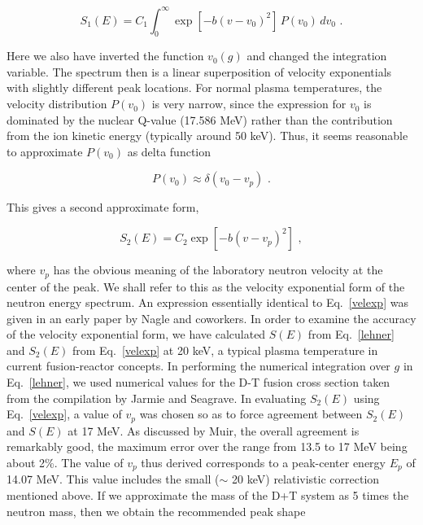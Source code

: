 \begin{equation}
  S_1(E)=C_1 \int_0^\infty \exp[-b(v-v_0)^2]\,P(v_0)\,dv_0 \,\,.
\label{intexp}
\end{equation}

\noindent
Here we also have inverted the function $v_0(g)$ and changed the
integration variable.  The spectrum then is a linear superposition
of velocity exponentials with slightly different peak locations.
For normal plasma temperatures, the velocity distribution
$P(v_0)$ is very narrow, since the expression for $v_0$ is
dominated by the nuclear Q-value (17.586 MeV) rather than the
contribution from the ion kinetic energy (typically around
50 keV).  Thus, it seems reasonable to approximate $P(v_0)$ as
delta function

\begin{equation}
  P(v_0) \approx \delta(v_0-v_p) \,\,.
\end{equation}

\noindent
This gives a second approximate form,

\begin{equation}
  S_2(E)=C_2 \exp[-b(v-v_p)^2] \,\,,
\label{velexp}
\end{equation}

\noindent
where $v_p$ has the obvious meaning of the laboratory neutron
velocity at the center of the peak.  We shall refer to this as
the velocity exponential form of the neutron energy spectrum.
An expression essentially identical to Eq.~\ref{velexp} was
given in an early paper by Nagle and coworkers\cite{two}.
In order to examine the accuracy of the velocity exponential form,
we have calculated $S(E)$ from Eq.~\ref{lehner}
and $S_2(E)$ from Eq.~\ref{velexp}
at 20 keV, a typical plasma temperature in current fusion-reactor
concepts.  In performing the numerical integration over $g$ in
Eq.~\ref{lehner}, we used numerical values for the D-T fusion cross
section taken from the compilation by Jarmie and Seagrave\cite{three}.
In evaluating $S_2(E)$ using Eq.~\ref{velexp}, a value of $v_p$ was
chosen so as to force agreement between $S_2(E)$ and $S(E)$ at
17 MeV.  As discussed by Muir\cite{four}, the overall
agreement is remarkably good, the maximum error
over the range from 13.5 to 17 MeV being about 2\%.  The value of
$v_p$ thus derived corresponds to a peak-center energy $E_p$
of 14.07 MeV.  This value includes the small ($\sim$ 20 keV)
relativistic correction mentioned above.  If we approximate the
mass of the D{+}T system as 5 times the neutron mass, then we
obtain the recommended peak shape

